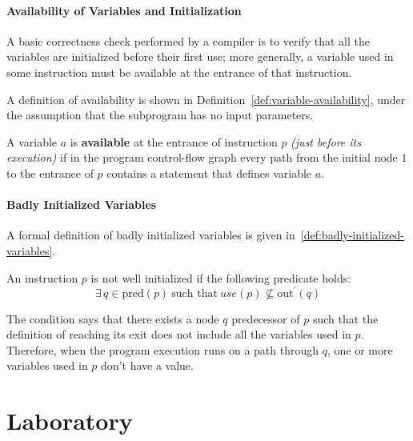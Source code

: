 \documentclass[english]{article}
\begin{document}
\paragraph{Availability of Variables and Initialization}

A basic correctness check performed by a compiler is to verify that all the variables are initialized before their first use;
more generally, a variable used in some instruction must be available at the entrance of that instruction.

A definition of availability is shown in Definition~\ref{def:variable-availability}, under the assumption that the subprogram has no input parameters.

\begin{definition}
  \label{def:variable-availability}
  A variable \(a\) is \textbf{available} at the entrance of instruction \(p\) \textit{(just before its execution)} if in the program control-flow graph every path from the initial node \(1\) to the entrance of \(p\) contains a statement that defines variable \(a\).
\end{definition}

\paragraph{Badly Initialized Variables}

A formal definition of badly initialized variables is given in~\ref{def:badly-initialized-variables}.

\begin{definition}
  \label{def:badly-initialized-variables}
  An instruction \(p\) is not well initialized if the following predicate holds:
  \[ \exists \, q \in \text{pred}(p) \ \text{such that} \ use(p) \nsubseteq \text{out}^\prime(q) \]
\end{definition}

The condition says that there exists a node \(q\) predecessor of \(p\) such that the definition of reaching its exit does not include all the variables used in \(p\).
Therefore, when the program execution runs on a path through \(q\), one or more variables used in \(p\) don't have a value.

\clearpage

\section{Laboratory}
\end{document}
